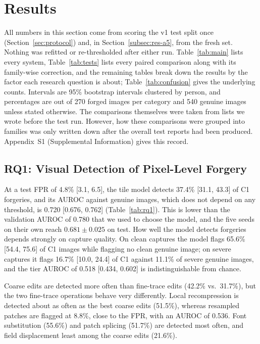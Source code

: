 \documentclass[12pt]{article}
\begin{document}
\section{Results}
\label{sec:results}

All numbers in this section come from scoring the v1 test split once (Section~\ref{sec:protocol}) and, in Section~\ref{subsec:res-a5}, from the fresh set. Nothing was refitted or re-thresholded after either run. Table~\ref{tab:main} lists every system, Table~\ref{tab:tests} lists every paired comparison along with its family-wise correction, and the remaining tables break down the results by the factor each research question is about; Table~\ref{tab:confusion} gives the underlying counts. Intervals are 95\% bootstrap intervals clustered by person, and percentages are out of 270 forged images per category and 540 genuine images unless stated otherwise. The comparisons themselves were taken from lists we wrote before the test run. However, how these comparisons were grouped into families was only written down after the overall test reports had been produced. Appendix~S1 (Supplemental Information) gives this record.



\subsection{RQ1: Visual Detection of Pixel-Level Forgery}
\label{subsec:res-rq1}

At a test FPR of 4.8\% [3.1, 6.5], the tile model detects 37.4\% [31.1, 43.3] of C1 forgeries, and its AUROC against genuine images, which does not depend on any threshold, is 0.720 [0.676, 0.762] (Table~\ref{tab:rq1}). This is lower than the validation AUROC of 0.780 that we used to choose the model, and the five seeds on their own reach $0.681\pm0.025$ on test. How well the model detects forgeries depends strongly on capture quality. On clean captures the model flags 65.6\%
[54.4, 75.6] of C1 images while flagging no clean genuine image; on
severe captures it flags 16.7\% [10.0, 24.4] of C1 against 11.1\% of
severe genuine images, and the tier AUROC of 0.518 [0.434, 0.602] is
indistinguishable from chance.

Coarse edits are detected more often than fine-trace edits (42.2\% vs.\
31.7\%), but the two fine-trace operations behave very differently.
Local recompression is detected about as often as the best coarse
edits (51.5\%), whereas resampled patches are flagged at 8.8\%, close to the FPR, with
an AUROC of 0.536. Font substitution (55.6\%) and patch splicing
(51.7\%) are detected most often, and field displacement least among
the coarse edits (21.6\%).
\end{document}
